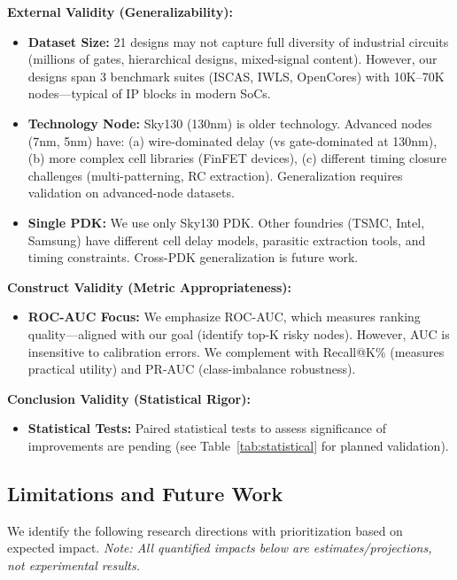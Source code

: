 \documentclass[10pt,twocolumn,journal]{IEEEtran}
\begin{document}
\textbf{External Validity (Generalizability):}
\begin{itemize}
    \item \textbf{Dataset Size:} 21 designs may not capture full diversity of industrial circuits (millions of gates, hierarchical designs, mixed-signal content). However, our designs span 3 benchmark suites (ISCAS, IWLS, OpenCores) with 10K--70K nodes---typical of IP blocks in modern SoCs.
    
    \item \textbf{Technology Node:} Sky130 (130nm) is older technology. Advanced nodes (7nm, 5nm) have: (a) wire-dominated delay (vs gate-dominated at 130nm), (b) more complex cell libraries (FinFET devices), (c) different timing closure challenges (multi-patterning, RC extraction). Generalization requires validation on advanced-node datasets.
    
    \item \textbf{Single PDK:} We use only Sky130 PDK. Other foundries (TSMC, Intel, Samsung) have different cell delay models, parasitic extraction tools, and timing constraints. Cross-PDK generalization is future work.
\end{itemize}

\textbf{Construct Validity (Metric Appropriateness):}
\begin{itemize}
    \item \textbf{ROC-AUC Focus:} We emphasize ROC-AUC, which measures ranking quality---aligned with our goal (identify top-K risky nodes). However, AUC is insensitive to calibration errors. We complement with Recall@K\% (measures practical utility) and PR-AUC (class-imbalance robustness).
\end{itemize}

\textbf{Conclusion Validity (Statistical Rigor):}
\begin{itemize}
    \item \textbf{Statistical Tests:} Paired statistical tests to assess significance of improvements are pending (see Table~\ref{tab:statistical} for planned validation).
\end{itemize}

\subsection{Limitations and Future Work}

We identify the following research directions with prioritization based on expected impact. \textit{Note: All quantified impacts below are estimates/projections, not experimental results.}
\end{document}
